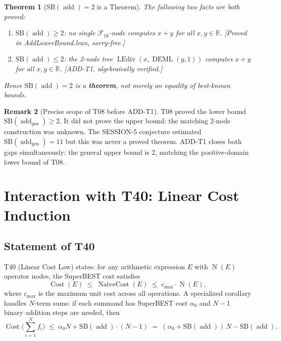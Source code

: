 \documentclass[12pt,a4paper]{article}
\newtheorem{theorem}{Theorem}[section]
\theoremstyle{definition}
\newtheorem{remark}[theorem]{Remark}
\newcommand{\DEML}{\operatorname{DEML}}
\newcommand{\LEdiv}{\operatorname{LEdiv}}
\newcommand{\addop}{\operatorname{add}}
\newcommand{\SB}{\mathrm{SB}}
\newcommand{\F}{\mathcal{F}_{16}}
\newcommand{\R}{\mathbb{R}}
\newcommand{\NC}{\operatorname{NaiveCost}}
\newcommand{\Cost}{\operatorname{Cost}}
\newcommand{\NOp}{\operatorname{N}}
\begin{document}
\begin{theorem}[$\SB(\addop)=2$ is a Theorem]
\label{thm:SB-add-2}
The following two facts are both proved:
\begin{enumerate}
\item[\textup{(LB)}] $\SB(\addop) \geq 2$: no single $\F$-node computes $x+y$
  for all $x,y\in\R$.  \textup{[Proved in AddLowerBound.lean, sorry-free.]}
\item[\textup{(UB)}] $\SB(\addop) \leq 2$: the 2-node tree
  $\LEdiv(x,\DEML(y,1))$ computes $x+y$ for all $x,y\in\R$.
  \textup{[ADD-T1, algebraically verified.]}
\end{enumerate}
Hence $\SB(\addop)=2$ is a \textbf{theorem}, not merely an equality of best-known bounds.
\end{theorem}

\begin{remark}[Precise scope of T08 before ADD-T1]
T08 proved the lower bound $\SB(\addop_{\text{pos}}) \geq 2$.  It did not prove
the upper bound: the matching 2-node construction was unknown.
The SESSION-5 conjecture estimated $\SB(\addop_{\text{gen}}) = 11$ but this was
never a proved theorem.  ADD-T1 closes both gaps simultaneously: the general upper
bound is 2, matching the positive-domain lower bound of T08.
\end{remark}

\section{Interaction with T40: Linear Cost Induction}
\label{sec:T40}

\subsection{Statement of T40}

T40 (Linear Cost Law) states: for any arithmetic expression $E$ with $\NOp(E)$
operator nodes, the SuperBEST cost satisfies
\[
  \Cost(E) \;\leq\; \NC(E) \;\leq\; c_{\max} \cdot \NOp(E),
\]
where $c_{\max}$ is the maximum unit cost across all operations.  A specialized
corollary handles $N$-term sums: if each summand has SuperBEST cost $\alpha_0$
and $N-1$ binary addition steps are needed, then
\[
  \Cost\!\bigl(\textstyle\sum_{i=1}^N f_i\bigr)
  \;\leq\; \alpha_0 N + \SB(\addop)\cdot(N-1)
  \;=\; (\alpha_0 + \SB(\addop))\,N - \SB(\addop).
\]
\end{document}

